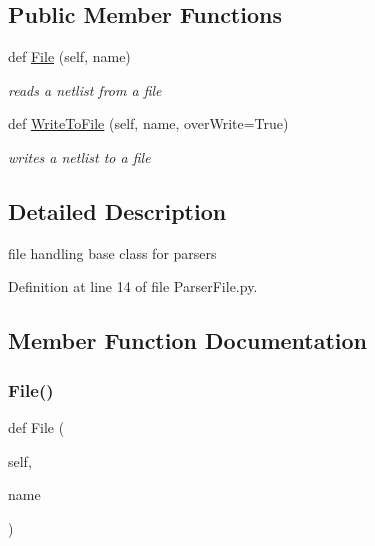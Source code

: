 \subsection*{Public Member Functions}
\begin{DoxyCompactItemize}
\item 
def \hyperlink{classSignalIntegrity_1_1Parsers_1_1ParserFile_1_1ParserFile_ab48ee0f71a0a2ded86c7adbc2a72034e}{File} (self, name)
\begin{DoxyCompactList}\small\item\em reads a netlist from a file \end{DoxyCompactList}\item 
def \hyperlink{classSignalIntegrity_1_1Parsers_1_1ParserFile_1_1ParserFile_a3ae128216b7f0540f8cd3793c4ed4903}{Write\+To\+File} (self, name, over\+Write=True)
\begin{DoxyCompactList}\small\item\em writes a netlist to a file \end{DoxyCompactList}\end{DoxyCompactItemize}


\subsection{Detailed Description}
file handling base class for parsers 

Definition at line 14 of file Parser\+File.\+py.



\subsection{Member Function Documentation}
\mbox{\label{classSignalIntegrity_1_1Parsers_1_1ParserFile_1_1ParserFile_ab48ee0f71a0a2ded86c7adbc2a72034e}} 
\subsubsection{\texorpdfstring{File()}{File()}}
{\footnotesize\ttfamily def File (\begin{DoxyParamCaption}\item[{}]{self,  }\item[{}]{name }\end{DoxyParamCaption})}



